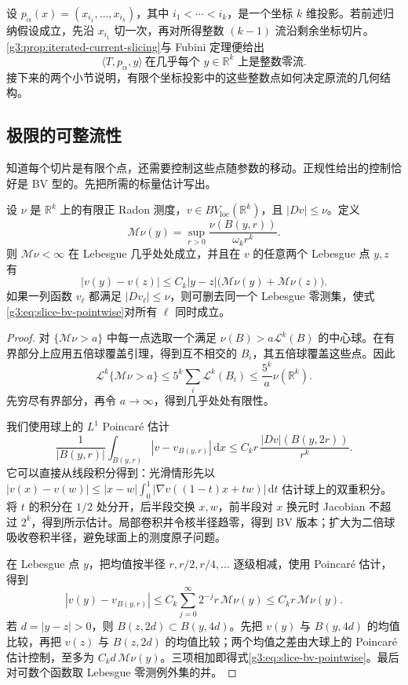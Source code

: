 \ProseParagraphBreak
设 \(p_\alpha(x)=(x_{i_1},\ldots,x_{i_k})\)，其中 \(i_1<\cdots<i_k\)，是一个坐标 \(k\) 维投影。若前述归纳假设成立，先沿 \(x_{i_1}\) 切一次，再对所得整数 \((k-1)\) 流沿剩余坐标切片。\cref{g3:prop:iterated-current-slicing}与 Fubini 定理便给出
\[
	\langle T,p_\alpha,y\rangle\ \text{在几乎每个 }y\in\mathbb R^k
	\text{ 上是整数零流}.
\]
接下来的两个小节说明，有限个坐标投影中的这些整数点如何决定原流的几何结构。

\subsection{极限的可整流性}
\label{g3:subsec:2205:04}
知道每个切片是有限个点，还需要控制这些点随参数的移动。正规性给出的控制恰好是 BV 型的。先把所需的标量估计写出。

\begin{lemma}\label{g3:lem:slice-bv-pointwise}
	设 \(\nu\) 是 \(\mathbb R^k\) 上的有限正 Radon 测度，\(v\in BV_{\mathrm{loc}}(\mathbb R^k)\)，且 \(|Dv|\le\nu\)。定义
	\[
		\mathcal M\nu(y)=\sup_{r>0}\frac{\nu(B(y,r))}{\omega_kr^k}.
	\]
	则 \(\mathcal M\nu<\infty\) 在 Lebesgue 几乎处处成立，并且在 \(v\) 的任意两个 Lebesgue 点 \(y,z\) 有
	\begin{equation}\label{g3:eq:slice-bv-pointwise}
		|v(y)-v(z)|
		\le C_k|y-z|\bigl(\mathcal M\nu(y)+\mathcal M\nu(z)\bigr).
	\end{equation}
	如果一列函数 \(v_\ell\) 都满足 \(|Dv_\ell|\le\nu\)，则可删去同一个 Lebesgue 零测集，使式\eqref{g3:eq:slice-bv-pointwise}对所有 \(\ell\) 同时成立。
\end{lemma}
\begin{proof}
	对 \(\{\mathcal M\nu>a\}\) 中每一点选取一个满足
	\(\nu(B)>a\mathcal L^k(B)\) 的中心球。在有界部分上应用五倍球覆盖引理，得到互不相交的 \(B_i\)，其五倍球覆盖这些点。因此
	\[
		\mathcal L^k\{\mathcal M\nu>a\}
		\le 5^k\sum_i\mathcal L^k(B_i)
		\le \frac{5^k}{a}\nu(\mathbb R^k).
	\]
	先穷尽有界部分，再令 \(a\to\infty\)，得到几乎处处有限性。

	我们使用球上的 \(L^1\) Poincaré 估计
	\[
		\frac{1}{|B(y,r)|}\int_{B(y,r)}|v-v_{B(y,r)}|\,\mathrm dx
		\le C_kr\,\frac{|Dv|(B(y,2r))}{r^k}.
	\]
	它可以直接从线段积分得到：光滑情形先以
	\(|v(x)-v(w)|\le |x-w|\int_0^1|\nabla v((1-t)x+tw)|\,\mathrm dt\)
	估计球上的双重积分。将 \(t\) 的积分在 \(1/2\) 处分开，后半段交换 \(x,w\)，前半段对 \(x\) 换元时 Jacobian 不超过 \(2^k\)，得到所示估计。局部卷积并令核半径趋零，得到 BV 版本；扩大为二倍球吸收卷积半径，避免球面上的测度原子问题。

	在 Lebesgue 点 \(y\)，把均值按半径 \(r, r/2,r/4,\ldots\) 逐级相减，使用 Poincaré 估计，得到
	\[
		|v(y)-v_{B(y,r)}|
		\le C_k\sum_{j=0}^{\infty}2^{-j}r\,\mathcal M\nu(y)
		\le C_kr\,\mathcal M\nu(y).
	\]
	若 \(d=|y-z|>0\)，则 \(B(z,2d)\subset B(y,4d)\)。先把 \(v(y)\) 与 \(B(y,4d)\) 的均值比较，再把 \(v(z)\) 与 \(B(z,2d)\) 的均值比较；两个均值之差由大球上的 Poincaré 估计控制，至多为 \(C_kd\,\mathcal M\nu(y)\)。三项相加即得式\eqref{g3:eq:slice-bv-pointwise}。最后对可数个函数取 Lebesgue 零测例外集的并。
\end{proof}

